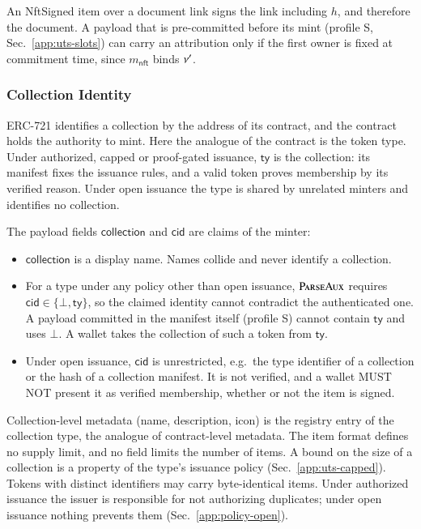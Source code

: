An NftSigned item over a document link signs the link including $h$, and therefore the document. A payload that is pre-committed before its mint (profile S, Sec.~\ref{app:uts-slots}) can carry an attribution only if the first owner is fixed at commitment time, since $m_\mathsf{nft}$ binds $\nu'$.

\subsubsection{Collection Identity}\label{app:nft-collection}

ERC-721 identifies a collection by the address of its contract, and the contract holds the authority to mint. Here the analogue of the contract is the token type. Under authorized, capped or proof-gated issuance, $\mathsf{ty}$ is the collection: its manifest fixes the issuance rules, and a valid token proves membership by its verified reason. Under open issuance the type is shared by unrelated minters and identifies no collection.

The payload fields $\mathsf{collection}$ and $\mathsf{cid}$ are claims of the minter:
\begin{itemize}
	\item $\mathsf{collection}$ is a display name. Names collide and never identify a collection.
	\item For a type under any policy other than open issuance, $\Call{ParseAux}{}$ requires $\mathsf{cid} \in \{\bot, \mathsf{ty}\}$, so the claimed identity cannot contradict the authenticated one. A payload committed in the manifest itself (profile S) cannot contain $\mathsf{ty}$ and uses $\bot$. A wallet takes the collection of such a token from $\mathsf{ty}$.
	\item Under open issuance, $\mathsf{cid}$ is unrestricted, e.g.\ the type identifier of a collection or the hash of a collection manifest. It is not verified, and a wallet MUST NOT present it as verified membership, whether or not the item is signed.
\end{itemize}

Collection-level metadata (name, description, icon) is the registry entry of the collection type, the analogue of contract-level metadata. The item format defines no supply limit, and no field limits the number of items. A bound on the size of a collection is a property of the type's issuance policy (Sec.~\ref{app:uts-capped}). Tokens with distinct identifiers may carry byte-identical items. Under authorized issuance the issuer is responsible for not authorizing duplicates; under open issuance nothing prevents them (Sec.~\ref{app:policy-open}).

